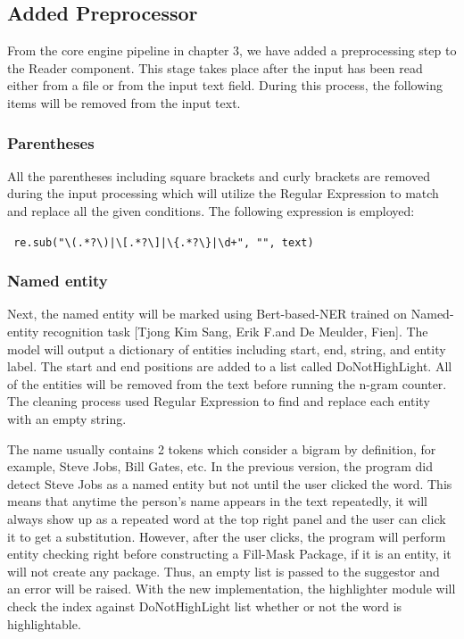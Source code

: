 \documentclass[12pt,oneside,openright,a4paper]{cpe-english-project}
\begin{document}
\subsection{Added Preprocessor}
From the core engine pipeline in chapter 3, we have added a preprocessing step to the Reader component. This stage takes place after the input has been read either from a file or from the input text field. During this process, the following items will be removed from the input text.
\subsubsection{Parentheses}
All the parentheses including square brackets and curly brackets are removed during the input processing which will utilize the Regular Expression to match and replace all the given conditions. The following expression is employed:

\verb/ re.sub("\(.*?\)|\[.*?\]|\{.*?\}|\d+", "", text)/

\subsubsection{Named entity}
Next, the named entity will be marked using Bert-based-NER trained on Named-entity recognition task [Tjong Kim Sang, Erik F.and De Meulder, Fien]. The model will output a dictionary of entities including start, end, string, and entity label. The start and end positions are added to a list called DoNotHighLight. All of the entities will be removed from the text before running the n-gram counter. The cleaning process used Regular Expression to find and replace each entity with an empty string.

The name usually contains 2 tokens which consider a bigram by definition, for example, Steve Jobs, Bill Gates, etc. In the previous version, the program did detect Steve Jobs as a named entity but not until the user clicked the word. This means that anytime the person's name appears in the text repeatedly, it will always show up as a repeated word at the top right panel and the user can click it to get a substitution. However, after the user clicks, the program will perform entity checking right before constructing a Fill-Mask Package, if it is an entity, it will not create any package. Thus, an empty list is passed to the suggestor and an error will be raised. With the new implementation, the highlighter module will check the index against DoNotHighLight list whether or not the word is highlightable.
\end{document}
